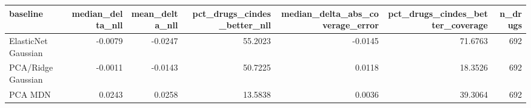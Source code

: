 \begin{tabular}{lrrrrrr}
\toprule
baseline & median\_delta\_nll & mean\_delta\_nll & pct\_drugs\_cindes\_better\_nll & median\_delta\_abs\_coverage\_error & pct\_drugs\_cindes\_better\_coverage & n\_drugs \\
\midrule
ElasticNet Gaussian & -0.0079 & -0.0247 & 55.2023 & -0.0145 & 71.6763 & 692 \\
PCA/Ridge Gaussian & -0.0011 & -0.0143 & 50.7225 & 0.0118 & 18.3526 & 692 \\
PCA MDN & 0.0243 & 0.0258 & 13.5838 & 0.0036 & 39.3064 & 692 \\
\bottomrule
\end{tabular}
